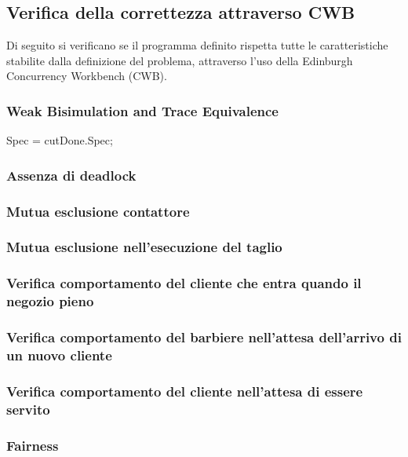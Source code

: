 \subsection{Verifica della correttezza attraverso CWB }

Di seguito si verificano se il programma definito rispetta tutte le caratteristiche stabilite dalla definizione del problema, attraverso l'uso della Edinburgh Concurrency Workbench (CWB).

\subsubsection{Weak Bisimulation and Trace Equivalence} 

Spec = cutDone.Spec;

\subsubsection{Assenza di deadlock}

\subsubsection{Mutua esclusione contattore}

\subsubsection{Mutua esclusione nell'esecuzione del taglio}

\subsubsection{Verifica comportamento del cliente che entra quando il negozio pieno}

\subsubsection{Verifica comportamento del barbiere nell'attesa dell'arrivo di un nuovo cliente }

\subsubsection{Verifica comportamento del cliente nell'attesa di essere servito }

\subsubsection{Fairness}



